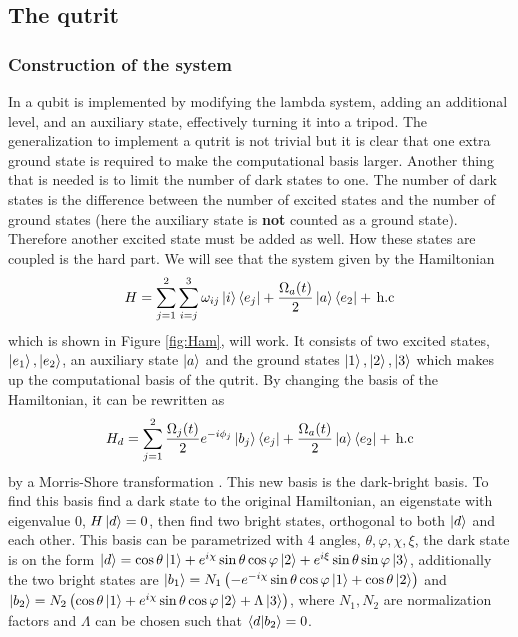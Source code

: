 \subsection{The qutrit}
\subsubsection{Construction of the system}
In \cite{darkpath} a qubit is implemented by modifying the lambda system, adding an additional level, and an auxiliary state, effectively turning it into a tripod. 
The generalization to implement a qutrit is not trivial but it is clear that one extra ground state is required to make the computational basis larger. Another thing that is needed is to limit the number of dark states to one. The number of dark states is the difference between the number of excited states and the number of ground states \cite{lambda} (here the auxiliary state is \textbf{not} counted as a ground state). Therefore another excited state must be added as well. How these states are coupled is the hard part. We will see that the system given by the Hamiltonian
\begin{equation}
\label{eq:Ham}
H = \sum_{j = 1}^2 \sum_{i =j}^{3} \omega_{ij}\ket{i}\bra{e_j}  + \frac{\Omega_{a}(t)}{2}\ket{a}\bra{e_2}  +\,\text{h.c}
\end{equation}
which is shown in Figure \ref{fig:Ham}, will work.  It consists of two excited states, $\ket{e_1}, \ket{e_2}$, an auxiliary state $\ket{a}$ and the ground states $\ket{1}, \ket{2}, \ket{3}$ which 
makes up the computational basis of the qutrit. By changing the basis of the Hamiltonian, it can be rewritten as 
\begin{equation}
\label{eq:Hamd}
H_d = \sum_{j = 1}^2 \frac{\Omega_j(t)}{2}e^{-i\phi_j}\ket{b_j}\bra{e_j}  + \frac{\Omega_a(t)}{2}\ket{a}\bra{e_2}  +\,\text{h.c}
\end{equation} 
by a Morris-Shore transformation \cite{morris}. This new basis is the dark-bright basis. To find this basis find a dark state to the original  Hamiltonian, an eigenstate with eigenvalue $0$, $H\ket{d} = 0$, then find two bright states, orthogonal to both $\ket{d}$ and each other. This basis can be parametrized with 4 angles, $\theta, \varphi, \chi, \xi$, the dark state is on the form $\ket{d} = \cos\theta\ket{1} + e^{i\chi}\sin\theta\cos\varphi\ket{2} + e^{i\xi}\sin\theta\sin\varphi\ket{3}$, additionally the two bright states are $\ket{b_1} = N_1 \left(-e^{-i\chi}\sin\theta\cos\varphi\ket{1} + \cos\theta\ket{2}\right)$ and $\ket{b_2} = N_2 \left(\cos\theta\ket{1} +  e^{i\chi}\sin\theta\cos\varphi\ket{2} + \Lambda \ket{3}\right ) $, where $N_1, N_2$ are normalization factors and $\Lambda$ can be chosen such that $\bra{d}\ket{b_2} = 0$.

